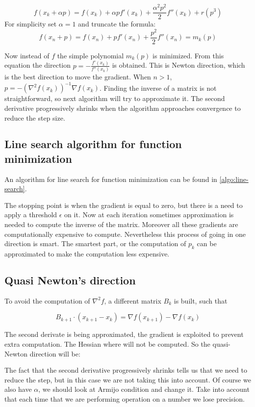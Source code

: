   $$
  f(x_k+\alpha p)=f(x_k) + \alpha p f'(x_k) + \frac{\alpha^2p^2}{2} f''(x_k) + r(p^3)
  $$
  For simplicity set $\alpha=1$ and truncate the formula:
  $$
  f(x_n+p)=f(x_n) + p f'(x_n) + \frac{p^2}{2} f''(x_n) = m_k(p)
  $$

  Now instead of $f$ the simple polynomial $m_k(p)$ is minimized.
  From this equation the direction $p = -\frac{f'(x_k)}{f''(x_k)}$ is obtained.
  This is Newton direction, which is the best direction to move the gradient.
  When $n>1$, $p = -(\nabla^2 f(x_k))^{-1}\nabla f(x_k)$.
  Finding the inverse of a matrix is not straightforward, so next algorithm will try to approximate it.
  The second derivative progressively shrinks when the algorithm approaches convergence to reduce the step size.

  \subsection{Line search algorithm for function minimization}
  An algorithm for line search for function minimization can be found in \ref{algo:line-search}.

  

  The stopping point is when the gradient is equal to zero, but there is a need to apply a threshold $\epsilon$ on it.
  Now at each iteration sometimes approximation is needed to compute the inverse of the matrix.
  Moreover all these gradients are computationally expensive to compute.
  Nevertheless this process of going in one direction is smart.
  The smartest part, or the computation of $p_k$ can be approximated to make the computation less expensive.


  \subsection{Quasi Newton's direction}
  To avoid the computation of $\nabla^2 f$, a different matrix $B_k$ is built, such that

  $$B_{k+1}\cdot (x_{k+1}-x_k) = \nabla f(x_{k+1})-\nabla f(x_k)$$

  The second derivate is being approximated, the gradient is exploited to prevent extra computation.
  The Hessian where will not be computed.
  So the quasi-Newton direction will be:

  The fact that the second derivative progressively shrinks tells us that
  we need to reduce the step, but in this case we are not taking this into
  account. Of course we also have $\alpha$, we should look at Armijo
  condition and change it.
  Take into account that each time that we are performing operation on a
  number we lose precision.

